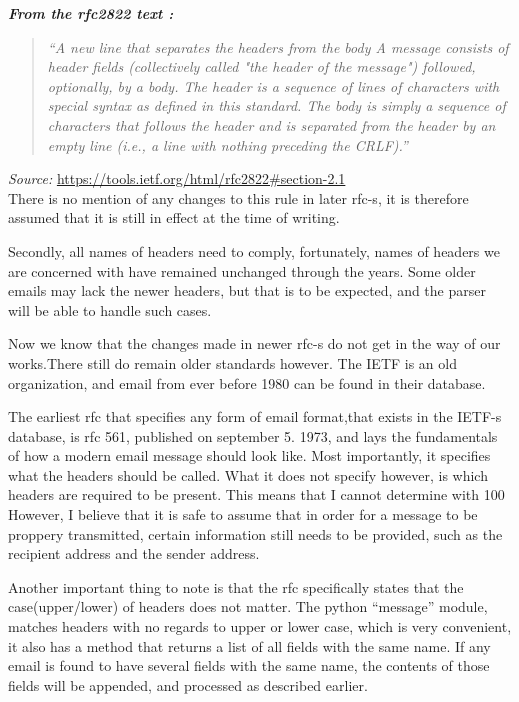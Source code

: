 \documentclass{report}
\begin{document}
\textbf{\textit{From the rfc2822 text :}} 
\begin{quotation}
\textit{``A new line that separates the headers from the body 
A message consists of header fields (collectively called "the header
   of the message") followed, optionally, by a body.  The header is a
   sequence of lines of characters with special syntax as defined in
   this standard. The body is simply a sequence of characters that
   follows the header and is separated from the header by an empty line
   (i.e., a line with nothing preceding the CRLF).''}\\
\end{quotation}
\textit{Source:}  \url{https://tools.ietf.org/html/rfc2822#section-2.1}\\

There is no mention of any changes to this rule in later rfc-s, it is therefore assumed that it is still in effect at the time of writing.

Secondly, all names of headers need to comply, fortunately, names of headers we are concerned with have remained unchanged through the years. Some older emails may lack the newer headers, but that is to be expected, and the parser will be able to handle such cases.

Now we know that the changes made in newer rfc-s do not get in the way of our works.There still do remain older standards however. The IETF is an old organization, and email from ever before 1980 can be found in their database.

The earliest rfc that specifies any form of email format,that exists in the IETF-s database, is rfc 561, published on september 5. 1973, and lays the fundamentals of how a modern email message should look like. Most importantly, it specifies what the headers should be called. What it does not specify however, is which headers are required to be present. This means that I cannot determine with 100%
However,  I believe that it is safe to assume that in order for a message to be proppery transmitted, certain information still needs to be provided, such as the recipient address and the sender address.  

Another important thing to note is that the rfc specifically states that the case(upper/lower) of headers does not matter. The python “message” module, matches headers with no regards to upper or lower case, which is very convenient, it also has a method that returns a list of all fields with the same name. If any email is found to have several fields with the same name, the contents of those fields will be appended, and processed as described earlier.
\end{document}
